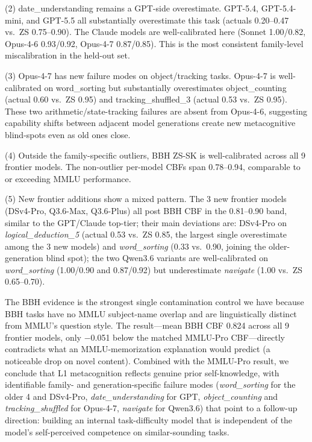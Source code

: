 \documentclass[11pt]{article}
\begin{document}
(2) date\_understanding remains a GPT-side overestimate. GPT-5.4, GPT-5.4-mini, and GPT-5.5 all substantially overestimate this task (actuals 0.20--0.47 vs.\ ZS 0.75--0.90). The Claude models are well-calibrated here (Sonnet 1.00/0.82, Opus-4-6 0.93/0.92, Opus-4-7 0.87/0.85). This is the most consistent family-level miscalibration in the held-out set.

(3) Opus-4-7 has new failure modes on object/tracking tasks. Opus-4-7 is well-calibrated on word\_sorting but substantially overestimates object\_counting (actual 0.60 vs.\ ZS 0.95) and tracking\_shuffled\_3 (actual 0.53 vs.\ ZS 0.95). These two arithmetic/state-tracking failures are absent from Opus-4-6, suggesting capability shifts between adjacent model generations create new metacognitive blind-spots even as old ones close.

(4) Outside the family-specific outliers, BBH ZS-SK is well-calibrated across all 9 frontier models. The non-outlier per-model CBFs span 0.78--0.94, comparable to or exceeding MMLU performance.

(5) New frontier additions show a mixed pattern. The 3 new frontier models (DSv4-Pro, Q3.6-Max, Q3.6-Plus) all post BBH CBF in the 0.81--0.90 band, similar to the GPT/Claude top-tier; their main deviations are: DSv4-Pro on \emph{logical\_deduction\_5} (actual 0.53 vs.\ ZS 0.85, the largest single overestimate among the 3 new models) and \emph{word\_sorting} (0.33 vs.\ 0.90, joining the older-generation blind spot); the two Qwen3.6 variants are well-calibrated on \emph{word\_sorting} (1.00/0.90 and 0.87/0.92) but underestimate \emph{navigate} (1.00 vs.\ ZS 0.65--0.70).

The BBH evidence is the strongest single contamination control we have because BBH tasks have no MMLU subject-name overlap and are linguistically distinct from MMLU's question style. The result---mean BBH CBF 0.824 across all 9 frontier models, only $-$0.051 below the matched MMLU-Pro CBF---directly contradicts what an MMLU-memorization explanation would predict (a noticeable drop on novel content). Combined with the MMLU-Pro result, we conclude that L1 metacognition reflects genuine prior self-knowledge, with identifiable family- and generation-specific failure modes (\emph{word\_sorting} for the older 4 and DSv4-Pro, \emph{date\_understanding} for GPT, \emph{object\_counting} and \emph{tracking\_shuffled} for Opus-4-7, \emph{navigate} for Qwen3.6) that point to a follow-up direction: building an internal task-difficulty model that is independent of the model's self-perceived competence on similar-sounding tasks.
\end{document}
